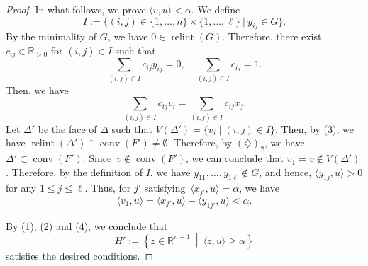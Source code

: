 \documentclass[11pt]{article}
\theoremstyle{definition}
\numberwithin{equation}{section}
\begin{document}
\begin{proof}
In what follows, we prove $\langle v, u \rangle < \alpha$. 
We define 
\[
I := \bigl\{ (i,j) \in \{ 1, \ldots , n\} \times \{ 1 , \ldots, \ell \} \ \big| \  y_{ij} \in G \bigr\}. 
\]
By the minimality of $G$, we have $0 \in \operatorname{relint}(G)$. 
Therefore, there exist $c_{ij} \in \mathbb{R}_{>0}$ for $(i,j) \in I$ such that
\[
\sum _{(i,j) \in I} c_{ij} y_{ij} = 0, \quad \sum _{(i,j) \in I} c_{ij} = 1. 
\]
Then, we have 
\[\tag{3}
\sum _{(i,j) \in I} c_{ij} v_i = \sum _{(i,j) \in I} c_{ij} x_j. 
\]
Let $\Delta '$ be the face of $\Delta$ such that $V(\Delta ') = \{ v_i \mid (i,j) \in I \}$. 
Then, by (3), we have $\operatorname{relint}(\Delta ') \cap \operatorname{conv}(F') \not = \emptyset$. 
Therefore, by $(\diamondsuit)_2$, we have $\Delta' \subset \operatorname{conv}(F')$. 
Since~$v \not \in \operatorname{conv}(F')$, we can conclude that $v_1 = v \not \in V(\Delta ')$. 
Therefore, by the definition of $I$, we have $y_{11}, \ldots , y_{1\ell} \not \in G$, and hence, 
$\langle y_{1j}, u \rangle > 0$ for any $1 \le j \le \ell$. 
Thus, for $j'$ satisfying~$\langle x_{j'}, u \rangle = \alpha$, we have
\[\tag{4}
\langle v_1, u \rangle = \langle x_{j'}, u \rangle - \langle y_{1j'}, u \rangle < \alpha. 
\]

By (1), (2) and (4), we conclude that
\[
H' := \left\{ z \in \mathbb{R}^{n-1} \ \middle | \  \langle z, u \rangle \ge \alpha \right \}
\]
satisfies the desired conditions. 
\end{proof}
\end{document}
